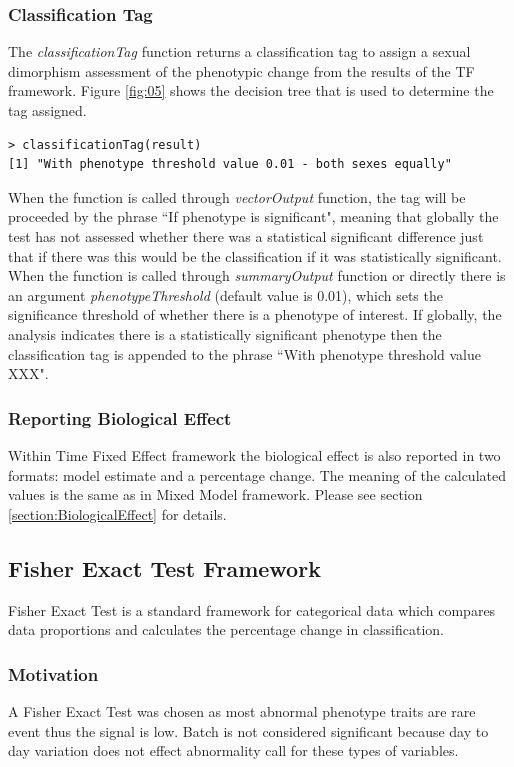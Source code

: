 \documentclass[12pt,a4paper]{article}
\begin{document}
\subsubsection{Classification Tag}
\label{TF_classificationTag}
The \textit{classificationTag} function returns a classification tag to assign a sexual dimorphism assessment of the phenotypic change from the results of the TF framework. Figure \ref{fig:05} shows the decision tree that is used to determine the tag assigned. 

\begingroup
\fontsize{8pt}{12pt}\selectfont
\begin{verbatim}
> classificationTag(result)
[1] "With phenotype threshold value 0.01 - both sexes equally"
\end{verbatim}
\endgroup

When the function is called through \textit{vectorOutput} function, the tag will be proceeded by the phrase “If phenotype is significant", meaning that globally the test has not assessed whether there was a statistical significant difference just that if there was this would be the classification if it was statistically significant. When the function is called through \textit{summaryOutput} function or directly there is an argument \textit{phenotypeThreshold} (default value is 0.01), which sets the significance threshold of whether there is a phenotype of interest. If globally, the analysis indicates there is a statistically significant phenotype then the classification tag is appended to the phrase “With phenotype threshold value XXX".

\subsubsection{Reporting Biological Effect}
Within Time Fixed Effect framework the biological effect is also reported in two formats: model estimate and a percentage change. The meaning of the calculated values is the same as in Mixed Model framework. Please see section \ref{section:BiologicalEffect} for details. 
\subsection{Fisher Exact Test Framework}
\label{section:FET}
Fisher Exact Test is a standard framework for categorical data which compares data proportions and calculates the percentage change in classification. 
\subsubsection{Motivation}
A Fisher Exact Test was chosen as most abnormal phenotype traits are rare event thus the signal is low. Batch is not considered significant because day to day variation does not effect abnormality call for these types of variables.
\end{document}
